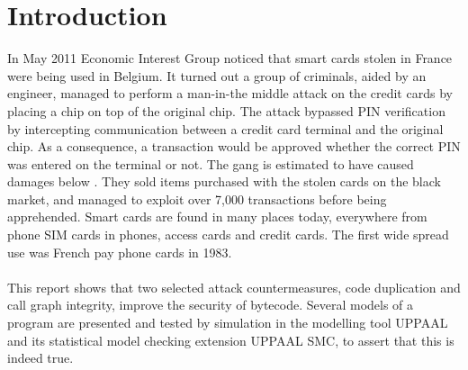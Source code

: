 \chapter{Introduction}
In May 2011 Economic Interest Group noticed that smart cards stolen in France were being used in Belgium\cite{fun}. It turned out a group of criminals, aided by an engineer, managed to perform a man-in-the middle attack on the credit cards by placing a chip on top of the original chip. The attack bypassed PIN verification by intercepting communication between a credit card terminal and the original chip. As a consequence, a transaction would be approved whether the correct PIN was entered on the terminal or not. The gang is estimated to have caused damages below . They sold items purchased with the stolen cards on the black market, and managed to exploit over 7,000 transactions before being apprehended. Smart cards are found in many places today, everywhere from phone SIM cards in phones, access cards and credit cards. The first wide spread use was French pay phone cards in 1983\cite[p. 366]{modbank}.\\\\

This report shows that two selected attack countermeasures, code duplication and call graph integrity, improve the security of \jc bytecode. Several models of a program are presented and tested by simulation in the modelling tool UPPAAL\cite{uppaal_site} and its statistical model checking extension UPPAAL SMC\cite{uppaal_smc_site}, to assert that this is indeed true.

